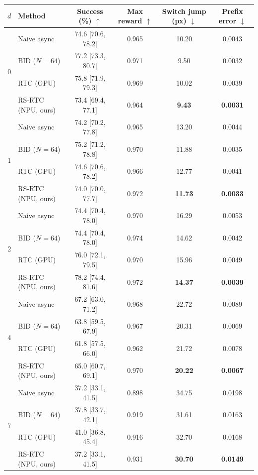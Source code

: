 \begin{tabular}{cl cccc}
\toprule
$d$ & Method & Success (\%) $\uparrow$ & Max reward $\uparrow$ & Switch jump (px) $\downarrow$ & Prefix error $\downarrow$ \\
\midrule
\multirow{4}{*}{0} & Naive async & 74.6 {\scriptsize[70.6, 78.2]} & 0.965 & 10.20 & 0.0043 \\
 & BID ($N{=}64$) & 77.2 {\scriptsize[73.3, 80.7]} & 0.971 & 9.50 & 0.0032 \\
 & RTC (GPU) & 75.8 {\scriptsize[71.9, 79.3]} & 0.969 & 10.02 & 0.0039 \\
 & RS-RTC (NPU, ours) & 73.4 {\scriptsize[69.4, 77.1]} & 0.964 & \textbf{9.43} & \textbf{0.0031} \\
\midrule
\multirow{4}{*}{1} & Naive async & 74.2 {\scriptsize[70.2, 77.8]} & 0.965 & 13.20 & 0.0044 \\
 & BID ($N{=}64$) & 75.2 {\scriptsize[71.2, 78.8]} & 0.970 & 11.88 & 0.0035 \\
 & RTC (GPU) & 74.6 {\scriptsize[70.6, 78.2]} & 0.966 & 12.77 & 0.0041 \\
 & RS-RTC (NPU, ours) & 74.0 {\scriptsize[70.0, 77.7]} & 0.972 & \textbf{11.73} & \textbf{0.0033} \\
\midrule
\multirow{4}{*}{2} & Naive async & 74.4 {\scriptsize[70.4, 78.0]} & 0.970 & 16.29 & 0.0053 \\
 & BID ($N{=}64$) & 74.4 {\scriptsize[70.4, 78.0]} & 0.974 & 14.62 & 0.0042 \\
 & RTC (GPU) & 76.0 {\scriptsize[72.1, 79.5]} & 0.970 & 15.96 & 0.0049 \\
 & RS-RTC (NPU, ours) & 78.2 {\scriptsize[74.4, 81.6]} & 0.972 & \textbf{14.37} & \textbf{0.0039} \\
\midrule
\multirow{4}{*}{4} & Naive async & 67.2 {\scriptsize[63.0, 71.2]} & 0.968 & 22.72 & 0.0089 \\
 & BID ($N{=}64$) & 63.8 {\scriptsize[59.5, 67.9]} & 0.967 & 20.31 & 0.0069 \\
 & RTC (GPU) & 61.8 {\scriptsize[57.5, 66.0]} & 0.962 & 21.72 & 0.0078 \\
 & RS-RTC (NPU, ours) & 65.0 {\scriptsize[60.7, 69.1]} & 0.970 & \textbf{20.22} & \textbf{0.0067} \\
\midrule
\multirow{4}{*}{7} & Naive async & 37.2 {\scriptsize[33.1, 41.5]} & 0.898 & 34.75 & 0.0198 \\
 & BID ($N{=}64$) & 37.8 {\scriptsize[33.7, 42.1]} & 0.919 & 31.61 & 0.0163 \\
 & RTC (GPU) & 41.0 {\scriptsize[36.8, 45.4]} & 0.916 & 32.70 & 0.0168 \\
 & RS-RTC (NPU, ours) & 37.2 {\scriptsize[33.1, 41.5]} & 0.931 & \textbf{30.70} & \textbf{0.0149} \\
\bottomrule
\end{tabular}
